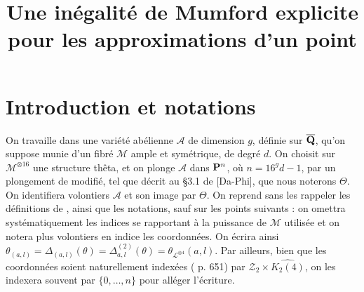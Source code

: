 

\newtheorem{thm}{Théorème}
\newtheorem{prop}[thm]{Proposition}
\newtheorem{lem}[thm]{Lemme}
\newtheorem{coro}[thm]{Corollaire}

\newcommand{\av}[2][v]{\left\lvert#2\right\rvert_{#1}}
\newcommand{\nv}[2][v]{\left\lVert#2\right\rVert_{#1}}
\newcommand{\nnv}[2][v]{%
  \left\lvert\hspace{-1pt}%
  \left\lvert\hspace{-1pt}%
  \left\lvert#2\right\rvert%
  \hspace{-1pt}\right\rvert%
  \hspace{-1pt}\right\rvert_{#1}}
\newcommand{\nvp}[2][v]{\|#2\|_{#1}}
\newcommand{\dv}{{\delta_v}}
\newcommand{\Dv}{\mathrm{dist}_v}
\newcommand{\A}{\mathcal{A}}
\newcommand{\p}[1]{{\boldsymbol{#1}}}
\newcommand{\OA}{\p{0}}
\newcommand{\coa}{\theta}
\newcommand{\BA}{\mathfrak{B}}
\newcommand{\hn}{\hat{h}}
\newcommand{\lgr}[1]{{|#1|}}
\newcommand{\vlg}[1]{\lgr #1}

\title{Une inégalité de Mumford explicite\\
  pour les approximations d'un point}



\maketitle

\section*{Introduction et notations}

On travaille dans une variété abélienne $\A$ de dimension $g$, définie sur
$\overline{\mathbf{Q}}$, qu'on suppose munie d'un fibré $\mathcal{M}$ ample et symétrique, de
degré $d$. On choisit sur $\mathcal{M}^{\otimes 16}$ une structure thêta, et
on plonge $\A$ dans $\mathbf{P}^n$, où $n=16^g d - 1$, par un plongement de
 modifié, tel que décrit au §3.1 de [Da-Phi], que nous noterons
$\Theta$. On identifiera volontiers $\A$ et son image par $\Theta$. On reprend
sans les rappeler les définitions de , ainsi que les notations,
sauf sur les points suivants : on omettra systématiquement les indices se
rapportant à la puissance de $\mathcal{M}$ utilisée et on notera plus
volontiers en indice les coordonnées. On écrira ainsi $\coa_{(a, l)} =
\Delta_{(a, l)}(\coa)  = \Delta_{a, l}^{(2)}(\coa) =
\coa_{\mathcal{L}^{\otimes 4}}(a, l)$. Par ailleurs, bien que les coordonnées
soient naturellement indexées ( p. 651) par $\mathcal{Z}_2 \times
\widehat{K_2(4)}$, on les indexera souvent par $\{0, \dots, n\}$ pour alléger
l'écriture.

